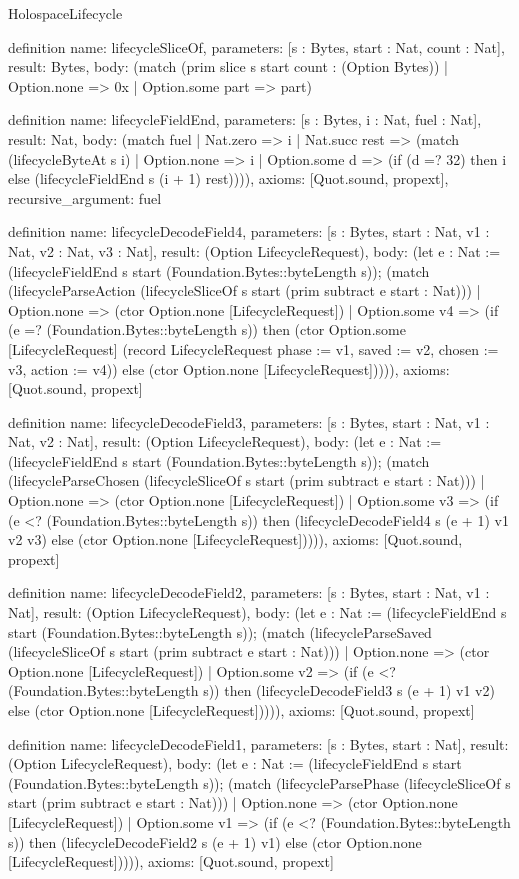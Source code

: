 \begin{lexlean}{HolospaceLifecycle}
\begin{semanticmodule}
definition{
  name: lifecycleSliceOf,
  parameters: [s : Bytes, start : Nat, count : Nat],
  result: Bytes,
  body: (match (prim slice s start count : (Option Bytes))
    | Option.none => 0x
    | Option.some part => part)
}

definition{
  name: lifecycleFieldEnd,
  parameters: [s : Bytes, i : Nat, fuel : Nat],
  result: Nat,
  body: (match fuel
    | Nat.zero => i
    | Nat.succ rest => (match (lifecycleByteAt s i)
      | Option.none => i
      | Option.some d => (if (d =? 32) then i else (lifecycleFieldEnd s (i + 1) rest)))),
  axioms: [Quot.sound, propext],
  recursive_argument: fuel
}

definition{
  name: lifecycleDecodeField4,
  parameters: [s : Bytes, start : Nat, v1 : Nat, v2 : Nat, v3 : Nat],
  result: (Option LifecycleRequest),
  body: (let e : Nat := (lifecycleFieldEnd s start (Foundation.Bytes::byteLength s)); (match (lifecycleParseAction (lifecycleSliceOf s start (prim subtract e start : Nat)))
    | Option.none => (ctor Option.none [LifecycleRequest])
    | Option.some v4 => (if (e =? (Foundation.Bytes::byteLength s)) then (ctor Option.some [LifecycleRequest] (record LifecycleRequest {phase := v1, saved := v2, chosen := v3, action := v4})) else (ctor Option.none [LifecycleRequest])))),
  axioms: [Quot.sound, propext]
}

definition{
  name: lifecycleDecodeField3,
  parameters: [s : Bytes, start : Nat, v1 : Nat, v2 : Nat],
  result: (Option LifecycleRequest),
  body: (let e : Nat := (lifecycleFieldEnd s start (Foundation.Bytes::byteLength s)); (match (lifecycleParseChosen (lifecycleSliceOf s start (prim subtract e start : Nat)))
    | Option.none => (ctor Option.none [LifecycleRequest])
    | Option.some v3 => (if (e <? (Foundation.Bytes::byteLength s)) then (lifecycleDecodeField4 s (e + 1) v1 v2 v3) else (ctor Option.none [LifecycleRequest])))),
  axioms: [Quot.sound, propext]
}

definition{
  name: lifecycleDecodeField2,
  parameters: [s : Bytes, start : Nat, v1 : Nat],
  result: (Option LifecycleRequest),
  body: (let e : Nat := (lifecycleFieldEnd s start (Foundation.Bytes::byteLength s)); (match (lifecycleParseSaved (lifecycleSliceOf s start (prim subtract e start : Nat)))
    | Option.none => (ctor Option.none [LifecycleRequest])
    | Option.some v2 => (if (e <? (Foundation.Bytes::byteLength s)) then (lifecycleDecodeField3 s (e + 1) v1 v2) else (ctor Option.none [LifecycleRequest])))),
  axioms: [Quot.sound, propext]
}

definition{
  name: lifecycleDecodeField1,
  parameters: [s : Bytes, start : Nat],
  result: (Option LifecycleRequest),
  body: (let e : Nat := (lifecycleFieldEnd s start (Foundation.Bytes::byteLength s)); (match (lifecycleParsePhase (lifecycleSliceOf s start (prim subtract e start : Nat)))
    | Option.none => (ctor Option.none [LifecycleRequest])
    | Option.some v1 => (if (e <? (Foundation.Bytes::byteLength s)) then (lifecycleDecodeField2 s (e + 1) v1) else (ctor Option.none [LifecycleRequest])))),
  axioms: [Quot.sound, propext]
}


\end{semanticmodule}
\end{lexlean}
